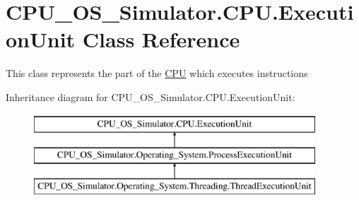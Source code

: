 \hypertarget{class_c_p_u___o_s___simulator_1_1_c_p_u_1_1_execution_unit}{}\section{C\+P\+U\+\_\+\+O\+S\+\_\+\+Simulator.\+C\+P\+U.\+Execution\+Unit Class Reference}
\label{class_c_p_u___o_s___simulator_1_1_c_p_u_1_1_execution_unit}


This class represents the part of the \hyperlink{namespace_c_p_u___o_s___simulator_1_1_c_p_u}{C\+P\+U} which executes instructions  


Inheritance diagram for C\+P\+U\+\_\+\+O\+S\+\_\+\+Simulator.\+C\+P\+U.\+Execution\+Unit\+:\begin{figure}[H]
\begin{center}
\leavevmode
\includegraphics[height=3.000000cm]{class_c_p_u___o_s___simulator_1_1_c_p_u_1_1_execution_unit}
\end{center}
\end{figure}
